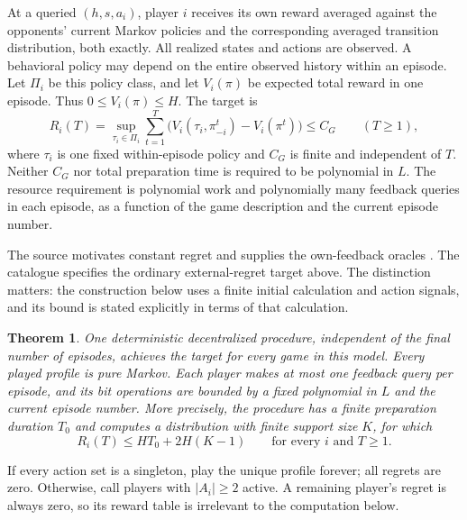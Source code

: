 \documentclass[11pt]{article}
\newtheorem{theorem}{Theorem}
\begin{document}
At a queried $(h,s,a_i)$, player $i$ receives its own reward averaged
against the opponents' current Markov policies and the corresponding
averaged transition distribution, both exactly. All realized states and actions are observed. A behavioral
policy may depend on the entire observed history within an episode.
Let $\Pi_i$ be this policy class, and let $V_i(\pi)$ be expected total
reward in one episode. Thus $0\leq V_i(\pi)\leq H$. The target is
\[
 R_i(T)=\sup_{\tau_i\in\Pi_i}\sum_{t=1}^T
       \bigl(V_i(\tau_i,\pi^t_{-i})-V_i(\pi^t)\bigr)\leq C_G
 \qquad(T\geq1),
\]
where $\tau_i$ is one fixed within-episode policy and $C_G$ is finite
and independent of $T$. Neither $C_G$ nor total preparation time is
required to be polynomial in $L$. The resource requirement is polynomial
work and polynomially many feedback queries in each episode, as a
function of the game description and the current episode number.

The source motivates constant regret and supplies the own-feedback
oracles \cite[\S\S2.3--2.5 and 5]{yb}. The catalogue specifies the
ordinary external-regret target above. The distinction matters: the
construction below uses a finite initial calculation and action signals,
and its bound is stated explicitly in terms of that calculation.

\begin{theorem}\label{main}
One deterministic decentralized procedure, independent of the final
number of episodes, achieves the target for every game in this model.
Every played profile is pure Markov. Each player makes at most one
feedback query per episode, and its bit operations are bounded by a
fixed polynomial in $L$ and the current episode number.
More precisely, the procedure has a finite preparation duration $T_0$
and computes a distribution with finite support size $K$, for which
\[
                  R_i(T)\leq H T_0+2H(K-1)
                  \qquad\text{for every }i\text{ and }T\geq1.
\]
\end{theorem}

If every action set is a singleton, play the unique profile forever;
all regrets are zero. Otherwise, call players with $|A_i|\geq2$ active.
A remaining player's regret is always zero, so its reward table is
irrelevant to the computation below.
\end{document}
